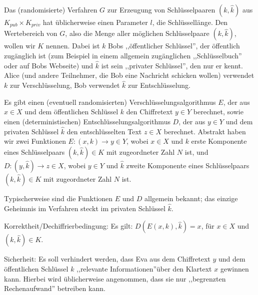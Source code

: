 \documentclass[a4paper]{article}
\begin{document}
\begin{multicols}{3}
{{{                Das (randomisierte) Verfahren $G$ zur Erzeugung von Schlüsselpaaren $(k,\hat{k})$ aus $K_{pub} \times K_{priv}$ hat üblicherweise einen Parameter $l$, die Schlüssellänge. Den Wertebereich von $G$, also die Menge aller möglichen Schlüsselpaare $(k,\hat{k})$, wollen wir $K$ nennen. Dabei ist $k$ Bobs ,,öffentlicher Schlüssel'', der öffentlich zugänglich ist (zum Beispiel in einem allgemein zugänglichen ,,Schlüsselbuch'' oder auf Bobs Webseite) und $\hat{k}$ ist sein ,,privater Schlüssel'', den nur er kennt. Alice (und andere Teilnehmer, die Bob eine Nachricht schicken wollen) verwendet $k$ zur Verschlüsselung, Bob verwendet $\hat{k}$ zur Entschlüsselung.

                Es gibt einen (eventuell randomisierten) Verschlüsselungsalgorithmus $E$, der aus $x\in X$ und dem öffentlichen Schlüssel $k$ den Chiffretext $y\in Y$ berechnet, sowie einen (deterministischen) Entschlüsselungsalgorithmus $D$, der aus $y\in Y$ und dem privaten Schlüssel $\hat{k}$ den entschlüsselten Text $z\in X$ berechnet. Abstrakt haben wir zwei Funktionen $E: (x,k)\rightarrow y\in Y$, wobei $x\in X$ und $k$ erste Komponente eines Schlüsselpaars $(k,\hat{k})\in K$ mit zugeordneter Zahl $N$ ist, und $D:(y,\hat{k})\rightarrow z\in X$, wobei $y\in Y$ und $\hat{k}$ zweite Komponente eines Schlüsselpaars $(k,\hat{k})\in K$ mit zugeordneter Zahl $N$ ist.

                Typischerweise sind die Funktionen $E$ und $D$ allgemein bekannt; das einzige Geheimnis im Verfahren steckt im privaten Schlüssel $\hat{k}$.

                Korrektheit/Dechiffrierbedingung: Es gilt: $D(E(x,k), \hat{k}) =x$, für $x\in X$ und $(k,\hat{k})\in K$.

                Sicherheit: Es soll verhindert werden, dass Eva aus dem Chiffretext $y$ und dem öffentlichen Schlüssel $k$ ,,relevante Informationen''über den Klartext $x$ gewinnen kann. Hierbei wird üblicherweise angenommen, dass sie nur ,,begrenzten Rechenaufwand'' betreiben kann.

}}}
\end{multicols}
\end{document}
